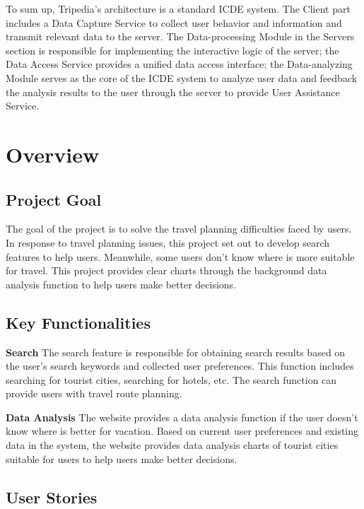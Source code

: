 \documentclass[conference]{IEEEtran}
\begin{document}
To sum up, Tripedia's architecture is a standard ICDE system. The Client part includes a Data Capture Service to collect user behavior and information and transmit relevant data to the server. The Data-processing Module in the Servers section is responsible for implementing the interactive logic of the server; the Data Access Service provides a unified data access interface; the Data-analyzing Module serves as the core of the ICDE system to analyze user data and feedback the analysis results to the user through the server to provide User Assistance Service.

\section{Overview}



\subsection{Project Goal}

The goal of the project is to solve the travel planning difficulties faced by users. In response to travel planning issues, this project set out to develop search features to help users. Meanwhile, some users don’t know where is more suitable for travel. This project provides clear charts through the background data analysis function to help users make better decisions. 

\subsection{Key Functionalities}

\textbf{Search} The search feature is responsible for obtaining search results based on the user's search keywords and collected user preferences. This function includes searching for tourist cities, searching for hotels, etc. The search function can provide users with travel route planning.

\textbf{Data Analysis} The website provides a data analysis function if the user doesn't know where is better for vacation. Based on current user preferences and existing data in the system, the website provides data analysis charts of tourist cities suitable for users to help users make better decisions.

\subsection{User Stories}
\end{document}
